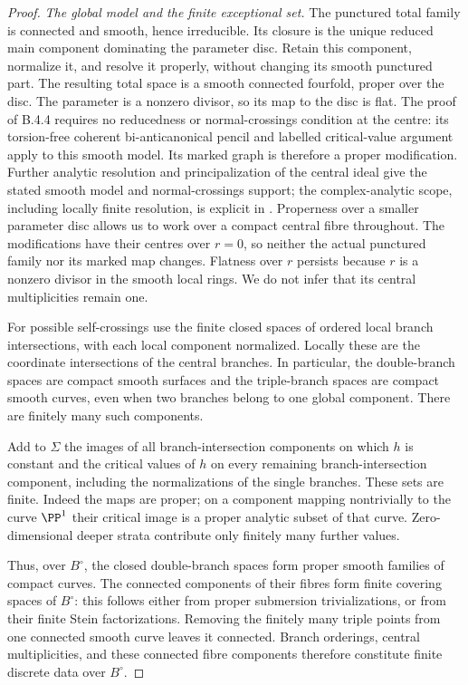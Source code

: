 \begin{proof}
\emph{The global model and the finite exceptional set.}
The punctured total family is connected and smooth, hence
irreducible. Its closure is the unique reduced main component
dominating the parameter disc. Retain this component, normalize
it, and resolve it properly, without changing its smooth
punctured part. The resulting total space is a smooth connected
fourfold, proper over the disc. The parameter is a nonzero
divisor, so its map to the disc is flat. The proof of B.4.4
requires no reducedness or normal-crossings condition at the
centre: its torsion-free coherent bi-anticanonical pencil and
labelled critical-value argument apply to this smooth model.
Its marked graph is therefore a proper modification.
Further analytic resolution and principalization of the central
ideal give the stated smooth
model and normal-crossings support; the complex-analytic scope,
including locally finite resolution, is explicit in
\citet[Theorems 1.6 and 1.10 and the paragraph following
Theorem 1.6]{BM95AB}. Properness over a smaller parameter disc
allows us to work over a compact central fibre throughout.
The modifications have their centres over $r=0$, so neither
the actual punctured family nor its marked map changes.
Flatness over $r$ persists because $r$ is a nonzero divisor in
the smooth local rings. We do not infer that its central
multiplicities remain one.

For possible self-crossings use the finite closed spaces of
ordered local branch intersections, with each local component
normalized. Locally these are the coordinate intersections of
the central branches. In particular, the double-branch spaces
are compact smooth surfaces and the triple-branch spaces are
compact smooth curves, even when two branches belong to one
global component. There are finitely many such components.

Add to $\Sigma$ the images of all branch-intersection components
on which $h$ is constant and the critical values of $h$ on every
remaining branch-intersection component, including the
normalizations of the single branches. These sets are finite.
Indeed the maps are proper; on a component mapping nontrivially
to the curve $\PP^1$ their critical image is a proper analytic
subset of that curve. Zero-dimensional deeper strata contribute
only finitely many further values.

Thus, over $B^\circ$, the closed double-branch spaces form
proper smooth families of compact curves. The connected
components of their fibres form finite covering spaces of
$B^\circ$: this follows either from proper submersion
trivializations, or from their finite Stein factorizations.
Removing the finitely many triple points from one connected
smooth curve leaves it connected. Branch orderings, central
multiplicities, and these connected fibre components therefore
constitute finite discrete data over $B^\circ$.


\end{proof}
